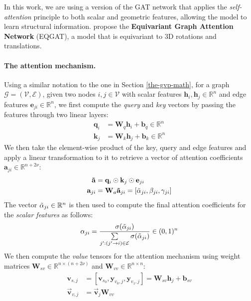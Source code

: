 In this work, we are using a version of the GAT network that applies the \textit{self-attention} principle to both scalar and geometric features, allowing the model to learn structural information. \citet{eqgat} propose the \textbf{Equivariant Graph Attention Network} (EQGAT), a model that is equivariant to 3D rotations and translations.

\paragraph{The attention mechanism.} Using a similar notation to the one in Section \ref{the-gvp-math}, for a graph $\mathcal{G} = (\mathcal{V}, \mathcal{E})$, given two nodes $i, j \in \mathcal{V}$ with scalar features $\mathbf{h}_i, \mathbf{h}_j \in \mathbb{R}^{n}$ and edge features $\mathbf{e}_{ji}\in \mathbb{R}^n$, we first compute the \textit{query} and \textit{key} vectors by passing the features through two linear layers:
\begin{align}
    \mathbf{q}_i &= \mathbf{W}_q\mathbf{h}_i + \mathbf{b}_q \in \mathbb{R}^n\\
    \mathbf{k}_j &= \mathbf{W}_k\mathbf{h}_j + \mathbf{b}_k \in \mathbb{R}^n
\end{align}
We then take the element-wise product of the key, query and edge features and apply a linear transformation to it to retrieve a vector of attention coefficients $\mathbf{a}_{ji} \in \mathbb{R}^{n + 2\nu}$:
\begin{align}
    \mathbf{\Tilde{a}} &= \mathbf{q}_i \odot \mathbf{k}_j \odot \mathbf{e}_{ji} \\
    \mathbf{a}_{ji} &= \mathbf{W}_a\mathbf{\Tilde{a}}_{ji} = [\Tilde{\mathbf{\alpha}}_{ji}, \mathbf{\beta}_{ji}, \mathbf{\gamma}_{ji}]
\label{attention-coeffs}
\end{align}
The vector $\Tilde{\mathbf{\alpha}}_{ji} \in \mathbb{R}^{n}$ is then used to compute the final attention coefficients for the \textit{scalar features} as follows:
\begin{equation}
    \mathbf{\alpha}_{ji} = \frac{\sigma(\Tilde{\mathbf{\alpha}}_{ji})}{\sum\limits_{j':(j'\rightarrow i)\in\mathcal{E}}\sigma(\Tilde{\mathbf{\alpha}}_{ji})} \in (0, 1)^{n}
\end{equation}
We then compute the \textit{value} tensors for the attention mechanism using weight matrices $\mathbf{W}_{sv}\in\mathbb{R}^{n\times (n+2\nu)}$ and $\mathbf{W}_{vv}\in\mathbb{R}^{n\times n}$:
\begin{align}
    \label{value-tensors} \mathbf{v}_{s, j} &= [\mathbf{v}_{s_0}, \mathbf{y}_{v_0, j}, \mathbf{y}_{v_1, j}] = \mathbf{W}_{sv}\mathbf{h}_j + \mathbf{b}_{sv}  
    \\ \vec{\mathbf{v}}_{v, j} &= \vec{\mathbf{v}}_j\mathbf{W}_{vv}
\end{align}

